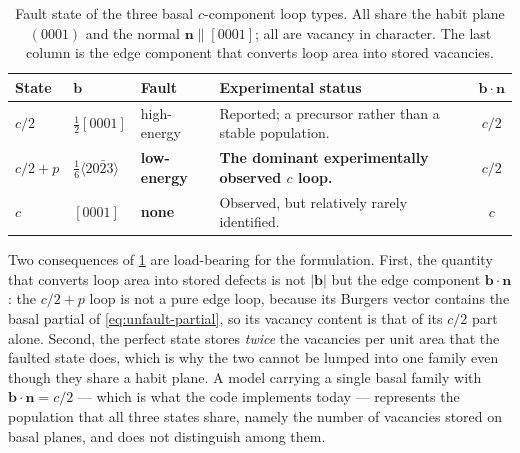 \documentclass{article}
\newcommand{\bvec}{\bm b}
\newcommand{\nvec}{\bm n}
\begin{document}
\begin{table}[htbp]
\centering
\caption{Fault state of the three basal $c$-component loop types. All share the
habit plane $(0001)$ and the normal $\nvec\parallel[0001]$; all are vacancy in
character. The last column is the edge component that converts loop area into
stored vacancies.}
\label{tab:cstates}
\begin{tabularx}{\textwidth}{@{}l l l X c@{}}
\toprule
State & $\bvec$ & Fault & Experimental status & $\bvec\!\cdot\!\nvec$\\
\midrule
$c/2$     & $\tfrac12[0001]$ & high-energy &
  Reported; a precursor rather than a stable population. & $c/2$\\
$c/2{+}p$ & $\tfrac16\langle20\bar23\rangle$ & \textbf{low-energy} &
  \textbf{The dominant experimentally observed $c$ loop.} & $c/2$\\
$c$       & $[0001]$ & \textbf{none} &
  Observed, but relatively rarely identified. & $c$\\
\bottomrule
\end{tabularx}
\end{table}

Two consequences of \cref{tab:cstates} are load-bearing for the formulation.
First, the quantity that converts loop area into stored defects is not
$|\bvec|$ but the edge component $\bvec\!\cdot\!\nvec$: the $c/2+p$ loop is not a
pure edge loop, because its Burgers vector contains the basal partial of
\cref{eq:unfault-partial}, so its vacancy content is that of its $c/2$ part
alone. Second, the perfect state stores \emph{twice} the vacancies per unit area
that the faulted state does, which is why the two cannot be lumped into one
family even though they share a habit plane. A model carrying a single basal
family with $\bvec\!\cdot\!\nvec=c/2$ --- which is what the code implements today
--- represents the population that all three states share, namely the number of
vacancies stored on basal planes, and does not distinguish among them.
\end{document}
